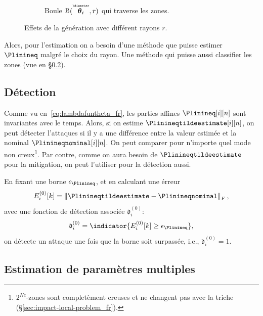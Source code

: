 \documentclass[../main.tex]{subfiles}
\begin{document}
\begin{figure}[h]
\begin{subfigure}{0.4\textwidth}
    \caption{Boule $\set{B}(\thetairestricted,r)$ qui traverse les zones.}\label{fig:ball_around_theta_restricted_traversing_fr}
  \end{subfigure}
  \caption{Effets de la génération avec différent rayons $r$.}
\end{figure}

Alors, pour l'estimation on a besoin d'une méthode que puisse estimer $\Plinineq$ malgré le choix du rayon.
Une méthode qui puisse aussi classifier les zones (vue en \S\ref{sec:cons-about-mult_fr}).

\newpage
\subsection{Détection}\label{sec:detection_ineq_fr}

Comme vu en~\eqref{eq:lambdafuntheta_fr}, les parties affines $\Plinineq[i][n]$ sont invariantes avec le temps.
Alors, si on estime $\Plinineqtildeestimate[i][n]$, on peut détecter l'attaques si il y a une différence entre la valeur estimée et la nominal $\Plinineqnominal[i][n]$.
On peut comparer pour n'importe quel mode non creux\footnote{$2^{Nc}$-zones sont completèment creuses et ne changent pas avec la triche (\S\ref{sec:impact-local-problem_fr}).}.
Par contre, comme on aura besoin de $\Plinineqtildeestimate$ pour la mitigation, on peut l'utiliser pour la détection aussi.

En fixant une borne $\epsilon_{\Plinineq}$, et en calculant une érreur
\begin{equation}
  E_{i}^{(0)}[k] =\norm{\Plinineqtildeestimate-\Plinineqnominal}_{F},
\end{equation}
avec une fonction de détection associée $\mathfrak{d}_{i}^{(0)}$:
\begin{equation}
  \label{eq:detection_ineq}
  \mathfrak{d}_{i}^{(0)}=\indicator{E_{i}^{(0)}[k]\geq\epsilon_{\Plinineq}},
\end{equation}
on détecte un attaque une fois que la borne soit surpassée, i.e., $\mathfrak{d}_{i}^{(0)}=1$.

\subsection{Estimation de paramètres multiples}\label{sec:cons-about-mult_fr}
\end{document}

